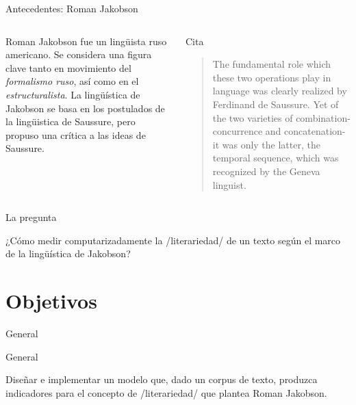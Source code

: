 \documentclass[presentation]{beamer}
\begin{document}
\begin{frame}[label={sec:org1d6e7f7}]{Antecedentes: Roman Jakobson}
\begin{columns}
\begin{column}{0.48\columnwidth}
Roman Jakobson fue un lingüista ruso americano. Se considera una
figura clave tanto en movimiento del \emph{formalismo ruso}, así como
en el \emph{estructuralista}.  La lingüística de Jakobson se basa en
los postulados de la lingüistica de Saussure, \alert{pero} propuso una
crítica a las ideas de Saussure.
\end{column}


\begin{column}{0.48\columnwidth}
\begin{block}{Cita}
\begin{quote}
The fundamental role which these two operations play in language
was clearly realized by Ferdinand de Saussure. Yet of the two
varieties of combination-concurrence and concatenation-it was only
the latter, the temporal sequence, which was recognized by the
Geneva linguist. 
\cite[99]{jakobson1956two}
\end{quote}
\end{block}
\end{column}
\end{columns}
\end{frame}




\begin{frame}[label={sec:orgd2898be}]{La pregunta}
\begin{block}{}
   ¿Cómo medir
   computarizadamente la /literariedad/ de un texto según el marco de la
   lingüística de Jakobson?
\end{block}
\end{frame}


\section{Objetivos}
\label{sec:org20eba3d}
\begin{frame}[label={sec:org1916615}]{General}
   \begin{block}{General}

Diseñar e implementar un modelo que, dado un corpus de texto, produzca
   indicadores para el concepto de /literariedad/ que plantea Roman Jakobson.
     \end{block}
\end{frame}
\end{document}
